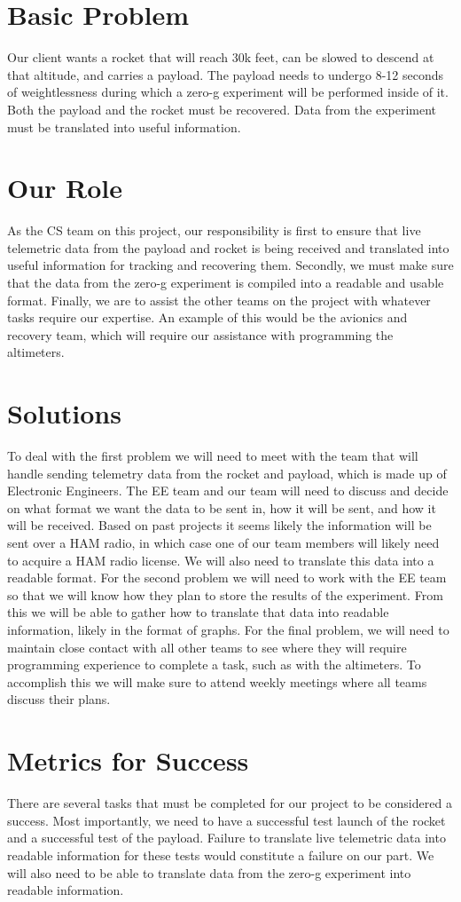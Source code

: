 \documentclass[onecolumn, draftclsnofoot,10pt, compsoc]{IEEEtran}
\begin{document}
\section{Basic Problem}
Our client wants a rocket that will reach 30k feet, can be slowed to descend at that altitude, and carries a payload.
The payload needs to undergo 8-12 seconds of weightlessness during which a zero-g experiment will be performed inside of it.
Both the payload and the rocket must be recovered.
Data from the experiment must be translated into useful information.

\section{Our Role}
As the CS team on this project, our responsibility is first to ensure that live telemetric data from the payload and rocket is being received and translated into useful information for tracking and recovering them.
Secondly, we must make sure that the data from the zero-g experiment is compiled into a readable and usable format.
Finally, we are to assist the other teams on the project with whatever tasks require our expertise.
An example of this would be the avionics and recovery team, which will require our assistance with programming the altimeters.

\section{Solutions}
To deal with the first problem we will need to meet with the team that will handle sending telemetry data from the rocket and payload, which is made up of Electronic Engineers.
The EE team and our team will need to discuss and decide on what format we want the data to be sent in, how it will be sent, and how it will be received.
Based on past projects it seems likely the information will be sent over a HAM radio, in which case one of our team members will likely need to acquire a HAM radio license.
We will also need to translate this data into a readable format.
For the second problem we will need to work with the EE team so that we will know how they plan to store the results of the experiment.
From this we will be able to gather how to translate that data into readable information, likely in the format of graphs.
For the final problem, we will need to maintain close contact with all other teams to see where they will require programming experience to complete a task, such as with the altimeters.
To accomplish this we will make sure to attend weekly meetings where all teams discuss their plans.

\section{Metrics for Success}
There are several tasks that must be completed for our project to be considered a success.
Most importantly, we need to have a successful test launch of the rocket and a successful test of the payload.
Failure to translate live telemetric data into readable information for these tests would constitute a failure on our part.
We will also need to be able to translate data from the zero-g experiment into readable information.
\end{document}
